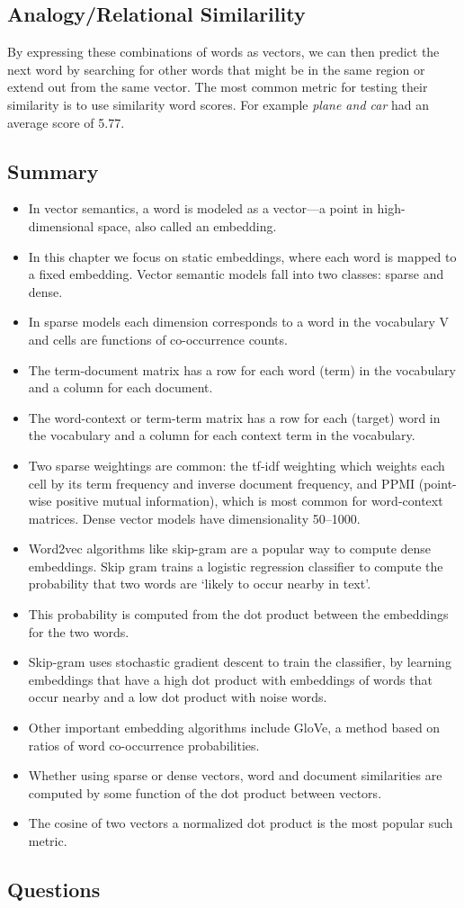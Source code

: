 \documentclass{article}
\begin{document}
\subsection{Analogy/Relational Similarility}

By expressing these combinations of words as vectors, we can then predict the next word by searching for other words that might be in the same region or extend out from the same vector.
The most common metric for testing their similarity is to use similarity word scores. For example \textit{plane and car} had an average score of 5.77.

\subsection{Summary}
\begin{itemize}
    \item In vector semantics, a word is modeled as a vector—a point in high-dimensional space, also called an embedding.
    \item In this chapter we focus on static embeddings, where each word is mapped to a fixed embedding. Vector semantic models fall into two classes: sparse and dense.
    \item In sparse models each dimension corresponds to a word in the vocabulary V and cells are functions of co-occurrence counts.
    \item The term-document matrix has a row for each word (term) in the vocabulary and a column for each document.
    \item The word-context or term-term matrix has a row for each (target) word in the vocabulary and a column for each context term in the vocabulary.
    \item Two sparse weightings are common: the tf-idf weighting which weights each cell by its term frequency and inverse document frequency, and PPMI (point- wise positive mutual information), which is most common for word-context matrices. Dense vector models have dimensionality 50–1000.
    \item Word2vec algorithms like skip-gram are a popular way to compute dense embeddings. Skip gram trains a logistic regression classifier to compute the probability that two words are ‘likely to occur nearby in text’.
    \item This probability is computed from the dot product between the embeddings for the two words.
    \item Skip-gram uses stochastic gradient descent to train the classifier, by learning embeddings that have a high dot product with embeddings of words that occur nearby and a low dot product with noise words.
    \item Other important embedding algorithms include GloVe, a method based on ratios of word co-occurrence probabilities.
    \item Whether using sparse or dense vectors, word and document similarities are
          computed by some function of the dot product between vectors.
    \item The cosine
          of two vectors a normalized dot product is the most popular such metric.

\end{itemize}


\subsection{Questions}
\end{document}

